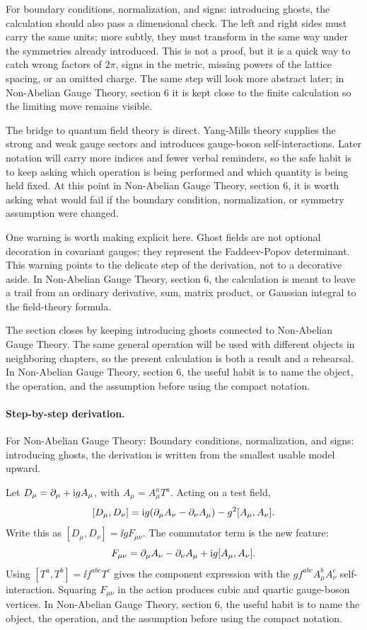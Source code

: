 For boundary conditions, normalization, and signs: introducing ghosts, the calculation should also pass a dimensional check.  The left and right sides must carry the same units; more subtly, they must transform in the same way under the symmetries already introduced.  This is not a proof, but it is a quick way to catch wrong factors of \(2\pi\), signs in the metric, missing powers of the lattice spacing, or an omitted charge.  The same step will look more abstract later; in Non-Abelian Gauge Theory, section 6 it is kept close to the finite calculation so the limiting move remains visible.

The bridge to quantum field theory is direct.  Yang-Mills theory supplies the strong and weak gauge sectors and introduces gauge-boson self-interactions.  Later notation will carry more indices and fewer verbal reminders, so the safe habit is to keep asking which operation is being performed and which quantity is being held fixed.  At this point in Non-Abelian Gauge Theory, section 6, it is worth asking what would fail if the boundary condition, normalization, or symmetry assumption were changed.

One warning is worth making explicit here.  Ghost fields are not optional decoration in covariant gauges; they represent the Faddeev-Popov determinant.  This warning points to the delicate step of the derivation, not to a decorative aside.  In Non-Abelian Gauge Theory, section 6, the calculation is meant to leave a trail from an ordinary derivative, sum, matrix product, or Gaussian integral to the field-theory formula.

The section closes by keeping introducing ghosts connected to Non-Abelian Gauge Theory.  The same general operation will be used with different objects in neighboring chapters, so the present calculation is both a result and a rehearsal.  In Non-Abelian Gauge Theory, section 6, the useful habit is to name the object, the operation, and the assumption before using the compact notation.



\paragraph{Step-by-step derivation.}

For Non-Abelian Gauge Theory: Boundary conditions, normalization, and signs: introducing ghosts, the derivation is written from the smallest usable model upward.

Let \(D_\mu=\partial_\mu+\mathrm i gA_\mu\), with \(A_\mu=A_\mu^aT^a\).  Acting on a test field,
\[
  [D_\mu,D_\nu]
  =
  \mathrm i g(\partial_\mu A_\nu-\partial_\nu A_\mu)-g^2[A_\mu,A_\nu].
\]
Write this as \([D_\mu,D_\nu]=\ii gF_{\mu\nu}\).  The commutator term is the new feature:
\[
  F_{\mu\nu}=\partial_\mu A_\nu-\partial_\nu A_\mu+\mathrm i g[A_\mu,A_\nu].
\]
Using \([T^a,T^b]=\ii f^{abc}T^c\) gives the component expression with the \(gf^{abc}A_\mu^bA_\nu^c\) self-interaction.  Squaring \(F_{\mu\nu}\) in the action produces cubic and quartic gauge-boson vertices.  In Non-Abelian Gauge Theory, section 6, the useful habit is to name the object, the operation, and the assumption before using the compact notation.

